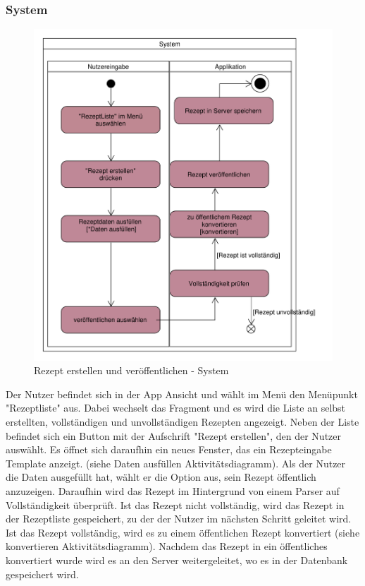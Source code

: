\subsubsection{System}
\begin{figure}[H]
	\centering
	\includegraphics[width=\textwidth]{pics/dynamicDiagram/AktivitaetsdiagrammRezepterstellenSystem.pdf}%
	\caption{Rezept erstellen und veröffentlichen - System}%
	\label{diagram}%
\end{figure}


Der Nutzer befindet sich in der App Ansicht und wählt im Menü den Menüpunkt "Rezeptliste" aus. Dabei wechselt das Fragment und es wird die Liste an selbst erstellten, vollständigen und unvollständigen Rezepten angezeigt. Neben der Liste befindet sich ein Button mit der Aufschrift "Rezept erstellen", den der Nutzer auswählt. Es öffnet sich daraufhin ein neues Fenster, das ein Rezepteingabe Template anzeigt. (siehe Daten ausfüllen Aktivitätsdiagramm). 
Als der Nutzer die Daten ausgefüllt hat, wählt er die Option aus, sein Rezept öffentlich anzuzeigen. Daraufhin wird das Rezept im Hintergrund von einem Parser auf Vollständigkeit überprüft. Ist das Rezept nicht vollständig, wird das Rezept in der Rezeptliste gespeichert, zu der der Nutzer im nächsten Schritt geleitet wird. Ist das Rezept vollständig, wird es zu einem öffentlichen Rezept konvertiert (siehe konvertieren Aktivitätsdiagramm). Nachdem das Rezept in ein öffentliches konvertiert wurde wird es an den Server weitergeleitet, wo es in der Datenbank gespeichert wird.

